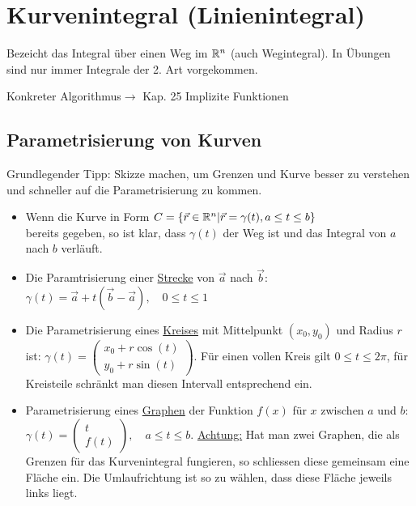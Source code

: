 \section{Kurvenintegral (Linienintegral)}
Bezeicht das Integral über einen Weg im $\mathbb{R}^n$ (auch Wegintegral). 
In Übungen sind nur immer Integrale der 2. Art vorgekommen. 

Konkreter Algorithmus$\rightarrow$ Kap. 25 Implizite Funktionen
\subsection{Parametrisierung von Kurven}
Grundlegender Tipp: Skizze machen, um Grenzen und Kurve besser zu verstehen und
schneller auf die Parametrisierung zu kommen.

\begin{itemize}[leftmargin=*]
	\item Wenn die Kurve in Form
	$
	C = \{\vec{r} \in \mathbb{R}^n | \vec{r} = \gamma(t), a \leq t \leq b\}
	$\\
	bereits gegeben, so ist klar, dass $\gamma(t)$ der Weg ist und das Integral von
	$a$ nach $b$ verläuft.
	
	\item Die Paramtrisierung einer \underline{Strecke} von $\vec{a}$ nach $\vec{b}$:\\
	$\gamma(t) = \vec{a} + t(\vec{b}-\vec{a}), \quad 0 \leq t \leq 1$
	
	\item Die Parametrisierung eines \underline{Kreises} mit Mittelpunkt $(x_0, y_0)$ und
	Radius $r$ ist: $\gamma(t) =
	\begin{pmatrix}
	x_0 + r \cos(t)\\
	y_0 + r \sin(t)
	\end{pmatrix}$. Für einen vollen Kreis gilt $0 \leq t \leq 2\pi$, für Kreisteile
	schränkt man diesen Intervall entsprechend ein.
	
	\item Parametrisierung eines \underline{Graphen} der Funktion $f(x)$ für $x$
	zwischen $a$ und $b$: $\gamma(t) =
	\begin{pmatrix}
	t\\
	f(t)
	\end{pmatrix}, \quad a \leq t \leq b$. \underline{Achtung:} Hat man zwei
	Graphen, die als Grenzen für das Kurvenintegral fungieren, so schliessen diese
	gemeinsam eine Fläche ein. Die Umlaufrichtung ist so zu wählen, dass diese
	Fläche jeweils links liegt.
\end{itemize}

